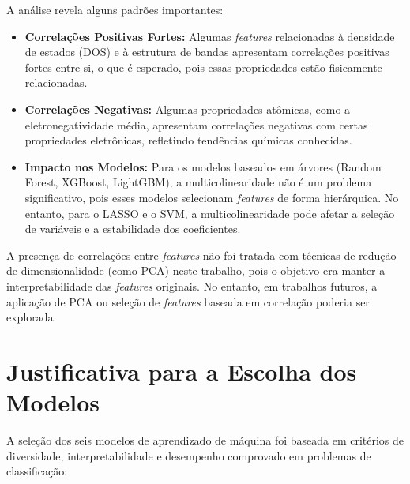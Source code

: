 \documentclass[12pt, a4paper, oneside]{report}
\begin{document}
A análise revela alguns padrões importantes:

\begin{itemize}
    \item \textbf{Correlações Positivas Fortes:} Algumas \textit{features} relacionadas à densidade de estados (DOS) e à estrutura de bandas apresentam correlações positivas fortes entre si, o que é esperado, pois essas propriedades estão fisicamente relacionadas.
    \item \textbf{Correlações Negativas:} Algumas propriedades atômicas, como a eletronegatividade média, apresentam correlações negativas com certas propriedades eletrônicas, refletindo tendências químicas conhecidas.
    \item \textbf{Impacto nos Modelos:} Para os modelos baseados em árvores (Random Forest, XGBoost, LightGBM), a multicolinearidade não é um problema significativo, pois esses modelos selecionam \textit{features} de forma hierárquica. No entanto, para o LASSO e o SVM, a multicolinearidade pode afetar a seleção de variáveis e a estabilidade dos coeficientes.
\end{itemize}

A presença de correlações entre \textit{features} não foi tratada com técnicas de redução de dimensionalidade (como PCA) neste trabalho, pois o objetivo era manter a interpretabilidade das \textit{features} originais. No entanto, em trabalhos futuros, a aplicação de PCA ou seleção de \textit{features} baseada em correlação poderia ser explorada.

\section{Justificativa para a Escolha dos Modelos}

A seleção dos seis modelos de aprendizado de máquina foi baseada em critérios de diversidade, interpretabilidade e desempenho comprovado em problemas de classificação:
\end{document}
